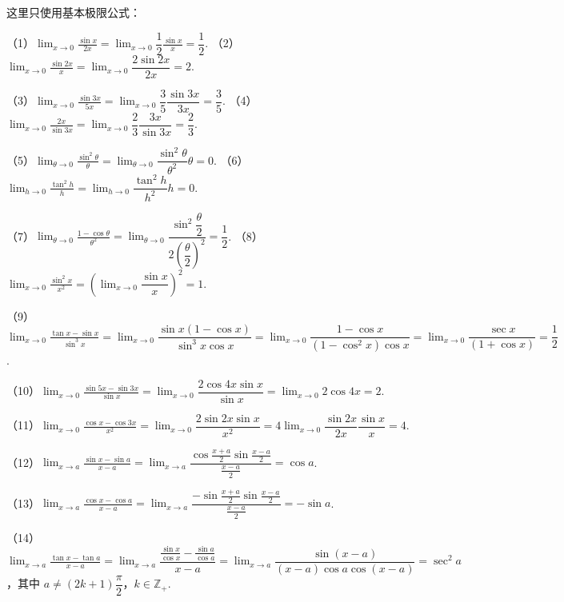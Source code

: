 \begin{solution}
    这里只使用基本极限公式：
    
    \vspace{0.5em}
    （1）$\displaystyle\lim_{x\to 0}\frac{\sin x}{2x}=\lim_{x\to 0}\dfrac12\frac{\sin x}{x}=\dfrac12$.\quad
    （2）$\displaystyle\lim_{x\to 0}\frac{\sin 2x}{x}=\lim_{x\to 0}\dfrac{2\sin 2x}{2x}=2$.
    
    \vspace{0.5em}
    （3）$\displaystyle\lim_{x\to 0}\frac{\sin 3x}{5x}=\lim_{x\to 0}\dfrac{3}{5}\dfrac{\sin 3x}{3x}=\dfrac{3}{5}$.\quad
    （4）$\displaystyle\lim_{x\to 0}\frac{2x}{\sin 3x}=\lim_{x\to 0}\dfrac{2}{3}\dfrac{3x}{\sin 3x}=\dfrac{2}{3}$.
    
    \vspace{0.5em}
    （5）$\displaystyle\lim_{\theta\to 0}\frac{\sin^2 \theta}{\theta}=\lim_{\theta\to 0}\dfrac{\sin^2 \theta}{\theta^2}\theta=0$.\quad
    （6）$\displaystyle\lim_{h\to 0}\frac{\tan^2 h}{h}=\lim_{h\to 0}\dfrac{\tan^2 h}{h^2}h=0$.
    
    \vspace{0.5em}
    （7）$\displaystyle\lim_{\theta\to 0}\frac{1-\cos \theta}{\theta^2}=\lim_{\theta\to 0}\dfrac{\sin^2 \dfrac{\theta}{2}}{2\left(\dfrac{\theta}{2}\right)^2}=\dfrac12$.
    （8）$\displaystyle\lim_{x\to 0}\frac{\sin^2 x}{x^2}=\left(\lim_{x\to 0}\dfrac{\sin x}{x}\right)^2=1$.
    
    \vspace{0.5em}
    （9）$\displaystyle\lim_{x\to 0}\frac{\tan x-\sin x}{\sin^3 x}=\lim_{x\to 0}\dfrac{\sin x(1-\cos x)}{\sin^3 x\cos x}=\lim_{x\to 0}\dfrac{1-\cos x}{(1-\cos^2x)\cos x}=\lim_{x\to 0}\dfrac{\sec x}{(1+\cos x)}=\dfrac12$.
    
    \vspace{0.5em}
    （10）$\displaystyle\lim_{x\to 0}\frac{\sin 5x-\sin 3x}{\sin x}=\lim_{x\to 0}\dfrac{2\cos 4x\sin x}{\sin x}=\lim_{x\to 0}2\cos 4x=2$.
    
    \vspace{0.5em}
    （11）$\displaystyle\lim_{x\to 0}\frac{\cos x-\cos 3x}{x^2}=\lim_{x\to 0}\dfrac{2\sin 2x\sin x}{x^2}=4\lim_{x\to 0}\dfrac{\sin 2x}{2x}\dfrac{\sin x}{x}=4$.
    
    \vspace{0.5em}
    （12）$\displaystyle\lim_{x\to a}\frac{\sin x-\sin a}{x-a}=\lim_{x\to a}\dfrac{\cos\frac{x+a}{2}\sin\frac{x-a}{2}}{\frac{x-a}{2}}=\cos a$.
    
    \vspace{0.5em}
    （13）$\displaystyle\lim_{x\to a}\frac{\cos x-\cos a}{x-a}=\lim_{x\to a}\dfrac{-\sin\frac{x+a}{2}\sin\frac{x-a}{2}}{\frac{x-a}{2}}=-\sin a$.
    
    \vspace{0.5em}
    （14）$\displaystyle\lim_{x\to a}\frac{\tan x-\tan a}{x-a}=\lim_{x\to a}\dfrac{\frac{\sin x}{\cos x}-\frac{\sin a}{\cos a}}{x-a}=\lim_{x\to a}\dfrac{\sin(x-a)}{(x-a)\cos a\cos(x-a)}=\sec^2a$，其中 $a\neq (2k+1)\dfrac{\pi}{2}$，$k\in\mathbb{Z_+}$.
\end{solution}
